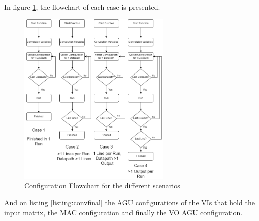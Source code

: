 In figure \ref{ConvFlowChart}, the flowchart of each case is presented.

\newpage
\begin{figure}[!htbp]
    \centering
    \includegraphics[width=0.65\textwidth]{Figures/ConvolutionFlowChart.drawio.png}
    \caption{Configuration Flowchart for the different scenarios}
    \label{ConvFlowChart}
\end{figure} 

And on listing \ref{listing:convfinal} the AGU configurations of the VIs that hold the input matrix, the MAC configuration and finally
the VO AGU configuration.




